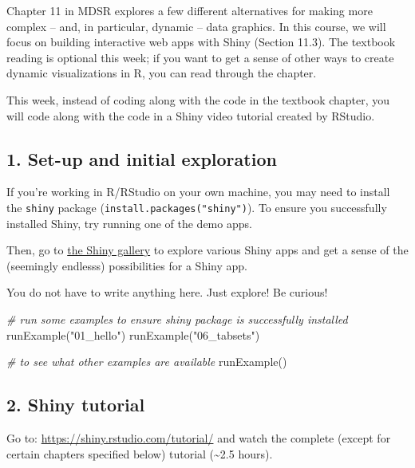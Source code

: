 \documentclass[
]{article}
\newenvironment{Shaded}{\begin{snugshade}}{\end{snugshade}}
\newcommand{\CommentTok}[1]{\textcolor[rgb]{0.56,0.35,0.01}{\textit{#1}}}
\newcommand{\FunctionTok}[1]{\textcolor[rgb]{0.00,0.00,0.00}{#1}}
\newcommand{\NormalTok}[1]{#1}
\newcommand{\StringTok}[1]{\textcolor[rgb]{0.31,0.60,0.02}{#1}}
\begin{document}
Chapter 11 in MDSR explores a few different alternatives for making more
complex -- and, in particular, dynamic -- data graphics. In this course,
we will focus on building interactive web apps with Shiny (Section
11.3). The textbook reading is optional this week; if you want to get a
sense of other ways to create dynamic visualizations in R, you can read
through the chapter.

This week, instead of coding along with the code in the textbook
chapter, you will code along with the code in a Shiny video tutorial
created by RStudio.

\hypertarget{set-up-and-initial-exploration}{%
\subsection{1. Set-up and initial
exploration}\label{set-up-and-initial-exploration}}

If you're working in R/RStudio on your own machine, you may need to
install the \texttt{shiny} package (\texttt{install.packages("shiny")}).
To ensure you successfully installed Shiny, try running one of the demo
apps.

Then, go to \href{https://shiny.rstudio.com/gallery/}{the Shiny gallery}
to explore various Shiny apps and get a sense of the (seemingly
endlesss) possibilities for a Shiny app.

You do not have to write anything here. Just explore! Be curious!

\begin{Shaded}
\begin{Highlighting}[]
\CommentTok{\# run some examples to ensure shiny package is successfully installed}
\FunctionTok{runExample}\NormalTok{(}\StringTok{"01\_hello"}\NormalTok{) }
\FunctionTok{runExample}\NormalTok{(}\StringTok{"06\_tabsets"}\NormalTok{) }

\CommentTok{\# to see what other examples are available}
\FunctionTok{runExample}\NormalTok{()}
\end{Highlighting}
\end{Shaded}

\newpage

\hypertarget{shiny-tutorial}{%
\subsection{2. Shiny tutorial}\label{shiny-tutorial}}

Go to: \url{https://shiny.rstudio.com/tutorial/} and watch the complete
(except for certain chapters specified below) tutorial
(\textasciitilde2.5 hours).
\end{document}
